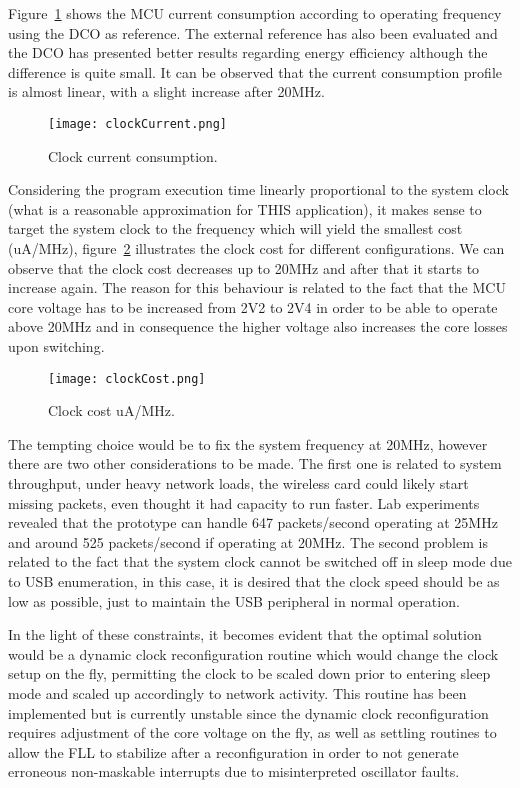 \documentclass[12pt]{article}
\begin{document}
Figure~\ref{fig:clockCurrent} shows the MCU current consumption according to operating frequency using the DCO as reference. The external reference has also been evaluated and the DCO has presented better results regarding energy efficiency although the difference is quite small. It can be observed that the current consumption profile is almost linear, with a slight increase after 20MHz.

\begin{figure}[H]
    \centering
    \texttt{[image: clockCurrent.png]}
    \caption{Clock current consumption.}
    \label{fig:clockCurrent}
\end{figure}

Considering the program execution time linearly proportional to the system clock (what is a reasonable approximation for THIS application), it makes sense to target the system clock to the frequency which will yield the smallest cost (uA/MHz), figure~\ref{fig:clockCost} illustrates the clock cost for different configurations. We can observe that the clock cost decreases up to 20MHz and after that it starts to increase again. The reason for this behaviour is related to the fact that the MCU core voltage has to be increased from 2V2 to 2V4 in order to be able to operate above 20MHz and in consequence the higher voltage also increases the core losses upon switching.

\begin{figure}[H]
    \centering
    \texttt{[image: clockCost.png]}
    \caption{Clock cost uA/MHz.}
    \label{fig:clockCost}
\end{figure}

The tempting choice would be to fix the system frequency at 20MHz, however there are two other considerations to be made. The first one is related to system throughput, under heavy network loads, the wireless card could likely start missing packets, even thought it had capacity to run faster. Lab experiments revealed that the prototype can handle 647 packets/second operating at 25MHz and around 525 packets/second if operating at 20MHz. The second problem is related to the fact that the system clock cannot be switched off in sleep mode due to USB enumeration, in this case, it is desired that the clock speed should be as low as possible, just to maintain the USB peripheral in normal operation.

In the light of these constraints, it becomes evident that the optimal solution would be a dynamic clock reconfiguration routine which would change the clock setup on the fly, permitting the clock to be scaled down prior to entering sleep mode and scaled up accordingly to network activity. This routine has been implemented but is currently unstable since the dynamic clock reconfiguration requires adjustment of the core voltage on the fly, as well as settling routines to allow the FLL to stabilize after a reconfiguration in order to not generate erroneous non-maskable interrupts due to misinterpreted oscillator faults.
\end{document}
